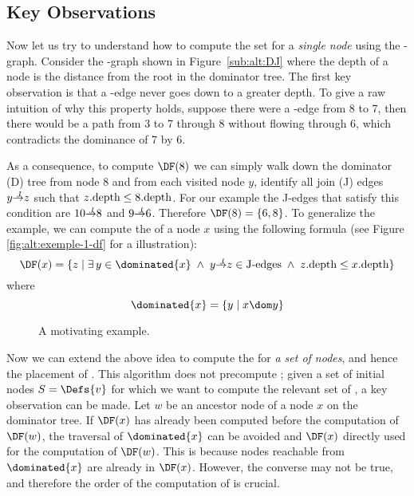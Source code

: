 {\subsection{Key Observations} 
 
Now let us try to understand how to compute the \DF set for a \emph{single node} using the \DJ-graph.
Consider the \DJ-graph shown in Figure~\ref{sub:alt:DJ} where the depth of 
a node is the  distance from the root in the dominator tree.
The first key observation is that a \DF-edge never goes down to a greater depth.
To give a raw intuition of why this property holds, suppose there were 
a \DF-edge from 
8 to 7, then there would be a path from 3 to 7 through 
  8 without flowing through 6, which contradicts the dominance of 7 by 6. 


As a consequence, to compute $\DF(8)$ we can simply walk down the dominator (D) tree from node 8 and from each visited node $y$, identify all join (J) edges $y \st{J} z$ such that $z.\textrm{depth} \leq 8.\textrm{depth}$. 
For our example the J-edges that satisfy this condition are $10 \st{J} 8$ and $9 \st{J} 6$. 
Therefore $\DF(8) = \{6, 8\}$. 
To generalize the example, we can compute the \DF of a node $x$ using the following formula (see Figure \ref{fig:alt:exemple-1-df} for a illustration):
$$\DF(x) = \{z\mid\exists\, y\in\dominated{x} \; \wedge \; y \st{J} z \in \textrm{J-edges} \; \wedge \; z.\depth \leq x.\depth \}$$
where 
$$\dominated{x} = \{ y\mid x\dom y \}$$


\begin{figure}[htb]
  \caption{A motivating example.}
  \label{fig:cfg}
\end{figure} 

Now we can extend the above idea to compute the \iDF for \emph{a set of nodes}, and hence the placement of \phifuns. 
This algorithm does not precompute \DF; 
given a set of initial nodes $S=\Defs{v}$ for which we want to compute the relevant set of \phifuns, a key observation can be made. 
Let $w$ be an ancestor node of a node $x$ on the dominator tree. 
If $\DF(x)$ has already been computed before the computation of $\DF(w)$, the traversal of $\dominated{x}$ can be avoided and $\DF(x)$ directly used for the computation of $\DF(w)$. 
This is because nodes reachable from $\dominated{x}$ are already in $\DF(x)$. 
However, the converse may not be true, and therefore the order of the computation of \DF is crucial.

}
